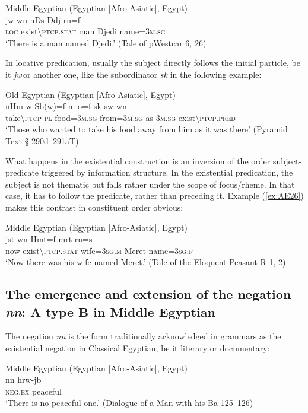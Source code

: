 \documentclass[output=paper]{langsci/langscibook}
\begin{document}
\ea Middle Egyptian (Egyptian [Afro-Asiatic], Egypt) \label{ex:AE24}\\
    \gll jw wn nDs Ddj rn=f\\ 
    \textsc{loc} exist\textbackslash\textsc{ptcp.stat} man Djedi name=\textsc{3m.sg}\\ 
    \glt ‘There is a man named Djedi.’ (Tale of pWestcar 6, 26) 
\z 
 
In locative predication, usually the subject directly follows the initial particle, be it \textit{jw} or another one, like the subordinator \textit{sk} in the following example:  

\ea Old Egyptian (Egyptian [Afro-Asiatic], Egypt) \label{ex:AE25}\\
    \gll nHm-w Sb(w)=f m-o=f sk sw wn\\ 
    take\textbackslash\textsc{ptcp-pl} food=\textsc{3m.sg} from=\textsc{3m.sg} as \textsc{3m.sg} exist\textbackslash\textsc{ptcp.pred}\\ 
    \glt ‘Those who wanted to take his food away from him as it was there’ (Pyramid Text § 290d–291aT) 
\z 
 
What happens in the existential construction is an inversion of the order subject-predicate triggered by information structure. In the existential predication, the subject is not thematic but falls rather under the scope of focus/rheme. In that case, it has to follow the predicate, rather than preceding it. Example (\ref{ex:AE26}) makes this contrast in constituent order obvious:  
 
\ea Middle Egyptian (Egyptian [Afro-Asiatic], Egypt) \label{ex:AE26}\\
    \gll jst wn Hmt=f mrt rn=s\\  
    now exist\textbackslash\textsc{ptcp.stat} wife=\textsc{3sg.m} Meret name=\textsc{3sg.f}\\  
    \glt ‘Now there was his wife named Meret.’ (Tale of the Eloquent Peasant R 1, 2) 
\z 


\subsection{The emergence and extension of the negation \textit{nn}: A type B in Middle Egyptian}\label{s:AE2-3}

The negation \textit{nn} is the form traditionally acknowledged in grammars as the existential negation in Classical Egyptian, be it literary or documentary: 
 
\ea Middle Egyptian (Egyptian [Afro-Asiatic], Egypt) \label{ex:AE27}\\
    \gll nn hrw-jb\\  
    \textsc{neg.ex} peaceful\\ 
    \glt ‘There is no peaceful one.’ (Dialogue of a Man with his Ba 125–126)
\z 
 
\end{document}
